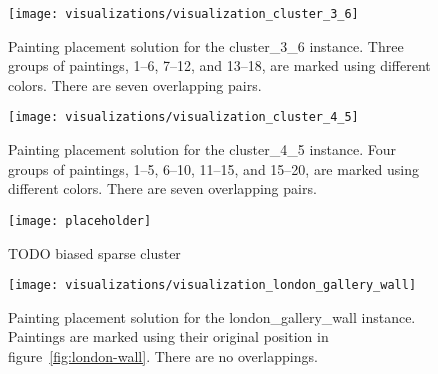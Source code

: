 \begin{figure}[h!]
    \texttt{[image: visualizations/visualization\_cluster\_3\_6]}
    \caption[Painting placement solution for the cluster\_3\_6 instance]
        { Painting placement solution for the cluster\_3\_6 instance.
    Three groups of paintings, \numrange{1}{6}, \numrange{7}{12}, and \numrange{13}{18}, are marked using different colors.
    There are seven overlapping pairs.}
    \label{fig:results:visualization-cluster-3-6}
\end{figure}

\begin{figure}[h!]
    \texttt{[image: visualizations/visualization\_cluster\_4\_5]}
    \caption[Painting placement solution for the cluster\_4\_5 instance]
        { Painting placement solution for the cluster\_4\_5 instance.
    Four groups of paintings, \numrange{1}{5}, \numrange{6}{10}, \numrange{11}{15}, and \numrange{15}{20}, are marked using different colors.
    There are seven overlapping pairs.}
    \label{fig:results:visualization-cluster-4-5}
\end{figure}

\begin{figure}[h!]
    \texttt{[image: placeholder]}
    \caption
    {TODO biased sparse cluster}
    \label{fig:results:visualization-biased-sparse-cluster}
\end{figure}

\begin{figure}[h!]
    \texttt{[image: visualizations/visualization\_london\_gallery\_wall]}
    \caption[Painting placement solution for the london\_gallery\_wall instance]
        { Painting placement solution for the london\_gallery\_wall instance.
    Paintings are marked using their original position in figure~\ref{fig:london-wall}.
    There are no overlappings.}
    \label{fig:results:visualization-london-gallery-wall}
\end{figure}


